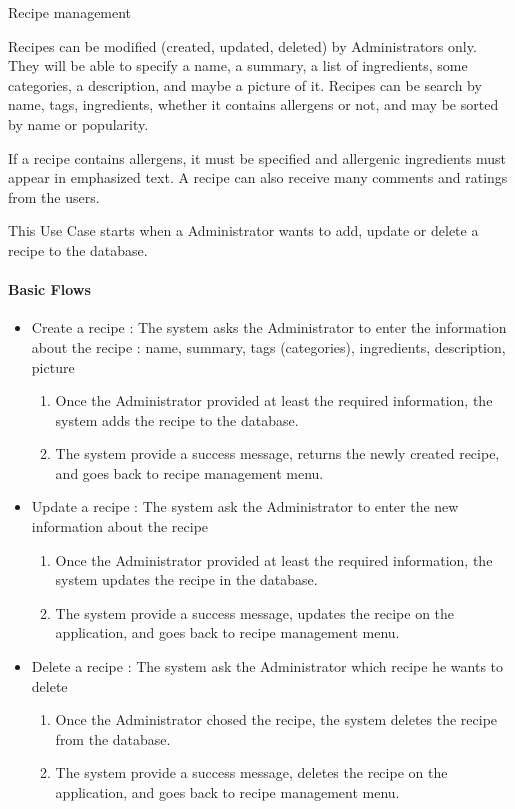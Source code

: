 \usecasedesc
{Recipe management \label{sec:recipeManagement}}
{
  Recipes can be modified (created, updated, deleted) by Administrators only. They will be able to specify a name, a summary, a list of ingredients, some categories, a description, and maybe a picture of it. Recipes can be search by name, tags, ingredients, whether it contains allergens or not, and may be sorted by name or popularity.
  
  If a recipe contains allergens, it must be specified and allergenic ingredients must appear in emphasized text. A recipe can also receive many comments and ratings from the users.

}
{
  This Use Case starts when a Administrator wants to add, update or delete a recipe to the database.

  \paragraph{Basic Flows}
  \begin{itemize}
    \item Create a recipe : The system asks the Administrator to enter the information about the recipe : name, summary, tags (categories), ingredients, description, picture
    \begin{enumerate}
      \item Once the Administrator provided at least the required information, the system adds the recipe to the database.
      \item The system provide a success message, returns the newly created recipe, and goes back to recipe management menu.
    \end{enumerate}
    \item Update a recipe : The system ask the Administrator to enter the new information about the recipe
    \begin{enumerate}
      \item Once the Administrator provided at least the required information, the system updates the recipe in the database.
      \item The system provide a success message, updates the recipe on the application, and goes back to recipe management menu.
    \end{enumerate}
    \item Delete a recipe : The system ask the Administrator which recipe he wants to delete
    \begin{enumerate}
      \item Once the Administrator chosed the recipe, the system deletes the recipe from the database.
      \item The system provide a success message, deletes the recipe on the application, and goes back to recipe management menu.
    \end{enumerate}
  \end{itemize}
}
